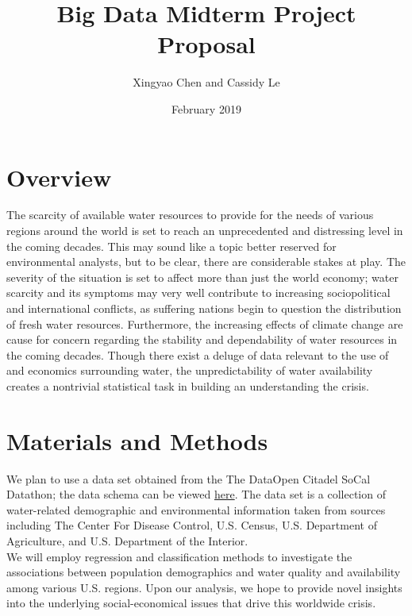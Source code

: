 \documentclass{article}
\title{Big Data Midterm Project Proposal}
\author{Xingyao Chen and Cassidy Le}
\date{February 2019}
\begin{document}
\maketitle

\section{Overview}
The scarcity of available water resources to provide for the needs of various regions around the world is set to reach an unprecedented and distressing level in the coming decades. This may sound like a topic better reserved for environmental analysts, but to be clear, there are considerable stakes at play. The severity of the situation is set to affect more than just the world economy; water scarcity and its symptoms may very well contribute to increasing sociopolitical and international conflicts, as suffering nations begin to question the distribution of fresh water resources. Furthermore, the increasing effects of climate change are cause for concern regarding the stability and dependability of water resources in the coming decades. Though there exist a deluge of data relevant to the use of and economics surrounding water, the unpredictability of water availability creates a nontrivial statistical task in building an understanding the crisis. 

\section{Materials and Methods}
We plan to use a data set obtained from the The DataOpen Citadel SoCal Datathon; the data schema can be viewed \href{https://drive.google.com/open?id=1fCQeQy01ulQ-UlhwPo4rM6qUNRgwARoE}{here}.
The data set is a collection of water-related demographic and environmental information taken from sources including The Center For Disease Control, U.S. Census, U.S. Department of Agriculture, 
and U.S. Department of the Interior. \\
We will employ regression and classification methods to investigate the associations between population demographics and water quality and availability among various U.S. regions. Upon our analysis, we hope to provide novel insights into the underlying social-economical issues that drive 
this worldwide crisis. 
\end{document}
